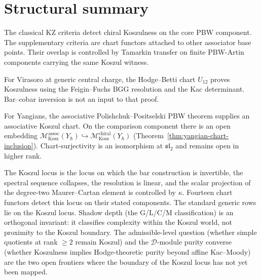 \documentclass[11pt,reqno]{amsart}
\theoremstyle{definition}
\theoremstyle{remark}
\newcommand{\cD}{\mathcal{D}}
\newcommand{\cM}{\mathcal{M}}
\numberwithin{equation}{section}
\begin{document}
\section{Structural summary}
\label{sec:first-principles-triples}

The classical KZ criteria detect chiral Koszulness on the core PBW
component. The supplementary criteria are chart functors attached
to other associator base points. Their overlap is controlled by
Tamarkin transfer on finite PBW-Artin components carrying the same
Koszul witness.

For Virasoro at generic central charge, the Hodge--Betti chart
$U_{12}$ proves Koszulness using the Feigin--Fuchs BGG resolution
and the Kac determinant. Bar--cobar inversion is not an input to
that proof.

For Yangians, the associative Polishchuk--Positselski PBW theorem
supplies an associative Koszul chart. On the comparison component
there is an open embedding
$\cM_{\mathrm{Kosz}}^{\mathrm{assoc}}(Y_\hbar) \hookrightarrow
 \cM_{\mathrm{Kosz}}^{\mathrm{chiral}}(Y_\hbar)$
(Theorem~\ref{thm:yangian-chart-inclusion}). Chart-surjectivity
is an isomorphism at $\mathfrak{sl}_2$ and remains open in higher
rank.

\bigskip

\noindent
The Koszul locus is the locus on which the bar construction is
invertible, the spectral sequence collapses, the resolution is
linear, and the scalar projection of the degree-two
Maurer--Cartan element is controlled by $\kappa$. Fourteen chart
functors detect this locus on their stated components.
The standard generic rows lie on the Koszul locus.
Shadow depth (the G/L/C/M classification) is an orthogonal invariant:
it classifies complexity within the Koszul world, not proximity to
the Koszul boundary. The admissible-level question (whether simple
quotients at rank $\geq 2$ remain Koszul) and the $\cD$-module
purity converse (whether Koszulness implies Hodge-theoretic purity
beyond affine Kac--Moody) are the two open frontiers where the
boundary of the Koszul locus has not yet been mapped.


\end{document}
